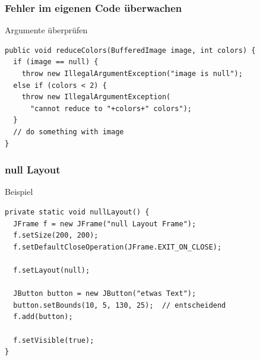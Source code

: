 \begin{frame}[fragile]
\frametitle{Fehler im eigenen Code überwachen}
	\begin{block}{Argumente überprüfen}
	\begin{lstlisting}
public void reduceColors(BufferedImage image, int colors) {
  if (image == null) {
    throw new IllegalArgumentException("image is null");
  else if (colors < 2) {
    throw new IllegalArgumentException(
      "cannot reduce to "+colors+" colors");
  }
  // do something with image
}
	\end{lstlisting}
	\end{block}
\end{frame}

\begin{frame}[fragile]
\frametitle{null Layout}
	\begin{block}{Beispiel}
	\begin{lstlisting}
private static void nullLayout() {
  JFrame f = new JFrame("null Layout Frame");
  f.setSize(200, 200);
  f.setDefaultCloseOperation(JFrame.EXIT_ON_CLOSE);

  f.setLayout(null);

  JButton button = new JButton("etwas Text");
  button.setBounds(10, 5, 130, 25);  // entscheidend
  f.add(button);
	
  f.setVisible(true);
}
	\end{lstlisting}
	\end{block}
\end{frame}






